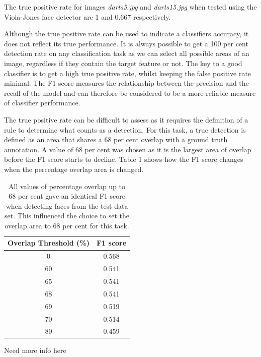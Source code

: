 \documentclass[conference]{IEEEtran}
\begin{document}
\par 
The true positive rate for images \emph{darts5.jpg} and \emph{darts15.jpg} when tested using the Viola-Jones face detector are 1 and 0.667 respectively. 
\par
Although the true positive rate can be used to indicate a classifiers accuracy, it does not reflect its true performance. It is always possible to get a 100 per cent detection rate on any classification task as we can select all possible areas of an image, regardless if they contain the target feature or not. The key to a good classifier is to get a high true positive rate, whilst keeping the false positive rate minimal. The F1 score measures the relationship between the precision and the recall of the model and can therefore be considered to be a more reliable measure of classifier performance.
\par
The true positive rate can be difficult to assess as it requires the definition of a rule to determine what counts as a detection. For this task, a true detection is defined as an area that shares a 68 per cent overlap with a ground truth annotation. A value of 68 per cent was chosen as it is the largest area of overlap before the F1 score starts to decline. Table 1 shows how the F1 score changes when the percentage overlap area is changed.
\par 
\begin{table}[!htp]
\caption{All values of percentage overlap up to 68 per cent gave an identical F1 score when detecting faces from the test data set. This influenced the choice to set the overlap area to 68 per cent for this task. }
\begin{center}
\begin{tabular}{||c|c||}
\hline
Overlap Threshold (\%) 	& F1 score 	\\ \hline
0 					& 0.568		\\
60 					& 0.541		\\
65					& 0.541		\\
68					& 0.541		\\
69					& 0.519		\\
70 					& 0.514		\\
80					& 0.459		\\ \hline
\end{tabular}
\end{center}
\label{default}
\end{table}%
\par
Need more info here

\newpage
\end{document}
